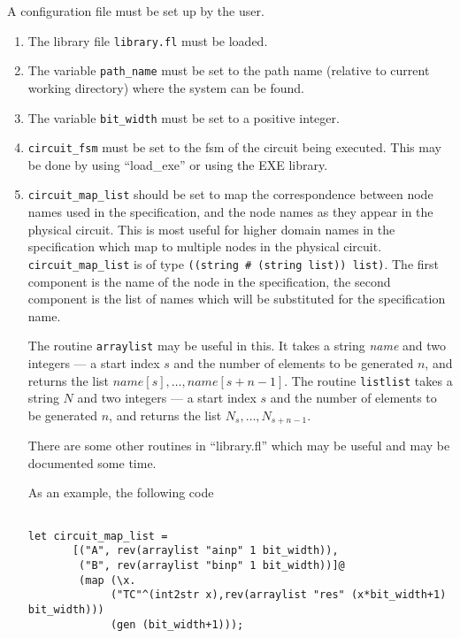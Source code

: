 A configuration file must  be set up by the user.


\begin{enumerate}

\item
The library file {\tt library.fl} must be loaded.

\item
The variable {\tt path\_name} must be set to the path name 
(relative to current working directory) where the system can
be found.

\item
The variable {\tt bit\_width} must be set to a positive integer.

\item
{\tt circuit\_fsm} must be set to the fsm of the circuit
being executed. This may be done by using ``load\_exe'' or
using the EXE library.

\item
{\tt circuit\_map\_list} should be set to map the correspondence
between node names used in the specification, and the node names
as they appear in the physical circuit. This is most useful
for higher domain names in the specification which map to 
multiple nodes in the physical circuit. {\tt circuit\_map\_list}
is of type {\tt ((string \# (string list)) list)}. The first
component is the name of the node in the specification, the
second component is the list of names which will be substituted
for the specification name.

The routine {\tt arraylist} may be useful in this. It takes
a string {\it name} and two integers --- a start index $s$ and
the number of elements to be generated $n$, and returns the
list $name[s], \ldots, name[s+n-1]$. 
The routine {\tt listlist} takes
a string $N$ and two integers --- a start index $s$ and
the number of elements to be generated $n$, and returns the
list $N_s, \ldots, N_{s+n-1}$.

There are some other routines
in ``library.fl'' which may be useful and may be documented some time.


As an example, the following code 

\begin{verbatim}

let circuit_map_list =
       [("A", rev(arraylist "ainp" 1 bit_width)),
        ("B", rev(arraylist "binp" 1 bit_width))]@
        (map (\x.
             ("TC"^(int2str x),rev(arraylist "res" (x*bit_width+1) bit_width)))
             (gen (bit_width+1)));

\end{verbatim}


\end{enumerate}
